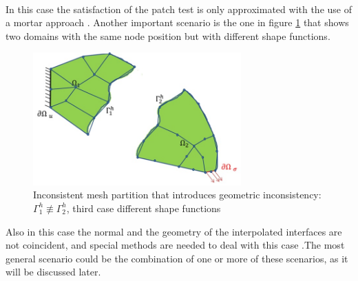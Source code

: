  \\
 In this case the satisfaction of the patch test is only approximated with the use of a mortar approach \cite{park2002simpl}. Another important scenario is the one in figure \ref{fig.7} that shows two domains with the same node position but with different shape functions. 
 \begin{figure}[ht]
 \centering
 \includegraphics[width=8cm]{images/Ch1/Mesh_inconsist_4}
 \caption{Inconsistent mesh partition that introduces geometric inconsistency: $\Gamma_1^{h} \not\equiv  \Gamma_2^{h} $, third case different shape functions} 
 \label{fig.7}
 \end{figure}
 Also in this case the normal and the geometry of the interpolated interfaces are not  coincident, and special methods are needed to deal with this case \cite{wang2017variationally}.The most general scenario could be the combination of one or more of these scenarios, as it will be discussed later.
 
